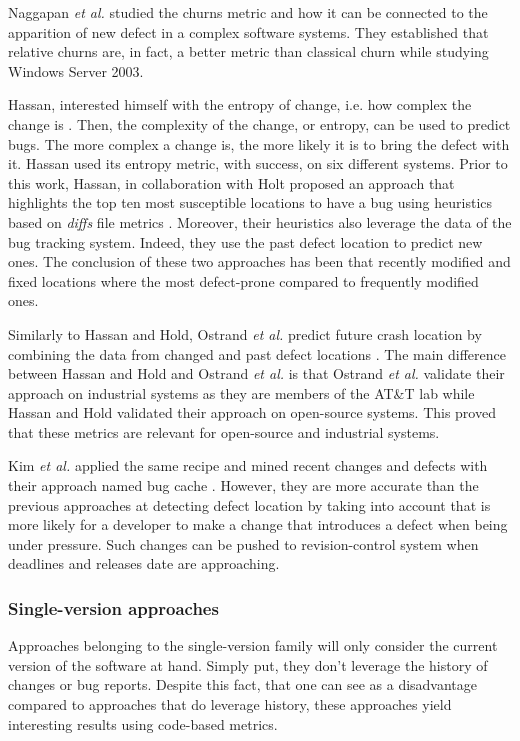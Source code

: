 Naggapan \textit{et al.} studied the churns metric and how it can be connected to the apparition of new defect in a complex software systems.
They established that relative churns are, in fact, a better metric than classical churn \cite{Nagappan} while studying Windows Server 2003.

Hassan, interested himself with the entropy of change, i.e. how complex the change is \cite{Hassan2009}.
Then, the complexity of the change, or entropy, can be used to predict bugs.
The more complex a change is, the more likely it is to bring the defect with it.
Hassan used its entropy metric, with success, on six different systems.
Prior to this work, Hassan, in collaboration with Holt proposed an approach that highlights the top ten most susceptible locations to have a bug using heuristics based on \textit{diffs} file metrics \cite{Hassan2005}.
Moreover, their heuristics also leverage the data of the bug tracking system.
Indeed, they use the past defect location to predict new ones.
The conclusion of these two approaches has been that recently modified and fixed locations where the most defect-prone compared to frequently modified ones.

Similarly to Hassan and Hold,  Ostrand \textit{et al.} predict future crash location by combining the data from changed and past defect locations \cite{Ostrand2005}.
The main difference between Hassan and Hold and Ostrand \textit{et al.} is that Ostrand \textit{et al.} validate their approach on industrial systems as they are members of the AT\&T lab while Hassan and Hold validated their approach on open-source systems.
This proved that these metrics are relevant for open-source and industrial systems.

Kim \textit{et al.} applied the same recipe and mined recent changes and defects with their approach named bug cache \cite{Kim2007a}.
However, they are more accurate than the previous approaches at detecting defect location by taking into account that is more likely for a developer to make a change that introduces a defect when being under pressure.
Such changes can be pushed to revision-control system when deadlines and releases date are approaching.

\subsubsection{Single-version approaches}

Approaches belonging to the single-version family will only consider the current version of the software at hand.
Simply put, they don't leverage the history of changes or bug reports.
Despite this fact, that one can see as a disadvantage compared to approaches that do leverage history, these approaches yield interesting results using code-based metrics.

